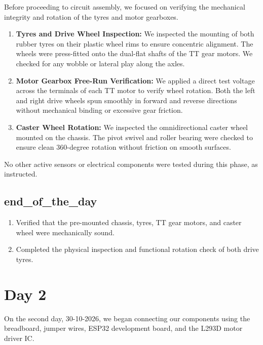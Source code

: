 \documentclass[11pt,a4paper]{article}
\begin{document}
Before proceeding to circuit assembly, we focused on verifying the mechanical integrity and rotation of the tyres and motor gearboxes.
\begin{enumerate}
    \item \textbf{Tyres and Drive Wheel Inspection:}
    We inspected the mounting of both rubber tyres on their plastic wheel rims to ensure concentric alignment. The wheels were press-fitted onto the dual-flat shafts of the TT gear motors. We checked for any wobble or lateral play along the axles.
    
    \item \textbf{Motor Gearbox Free-Run Verification:}
    We applied a direct test voltage across the terminals of each TT motor to verify wheel rotation. Both the left and right drive wheels spun smoothly in forward and reverse directions without mechanical binding or excessive gear friction.
    
    \item \textbf{Caster Wheel Rotation:}
    We inspected the omnidirectional caster wheel mounted on the chassis. The pivot swivel and roller bearing were checked to ensure clean 360-degree rotation without friction on smooth surfaces.
\end{enumerate}

No other active sensors or electrical components were tested during this phase, as instructed.

\subsection{end\_of\_the\_day}
\begin{enumerate}
    \item Verified that the pre-mounted chassis, tyres, TT gear motors, and caster wheel were mechanically sound.
    \item Completed the physical inspection and functional rotation check of both drive tyres.
\end{enumerate}

\section{Day 2}
On the second day, 30-10-2026, we began connecting our components using the breadboard, jumper wires, ESP32 development board, and the L293D motor driver IC.
\end{document}
